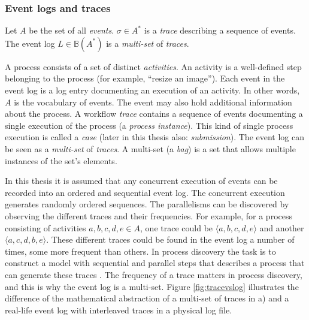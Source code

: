 \subsubsection{Event logs and traces}

\label{sec:eventtheory}

\begin{definition}
Let $A$ be the set of all \emph{events}. 
$\sigma \in A^*$ is a \emph{trace} describing a sequence of events.
The event log $L \in \mathbb{B}(A^*)$ is a \emph{multi-set} of \emph{traces}.
\end{definition}

A process consists of a set of distinct \emph{activities}.
An activity is a well-defined step belonging to the process (for example, ``resize an image'').
Each event in the event log is a log entry documenting an execution of an activity.
In other words, $A$ is the vocabulary of events.
The event may also hold additional information about the process.
A workflow \emph{trace} contains a sequence of events documenting a single execution of the process (a \emph{process instance}).
This kind of single process execution is called a \emph{case} (later in this thesis also: \emph{submission}).
The event log can be seen as a \emph{multi-set} of \emph{traces}. 
A multi-set (a \emph{bag}) is a set that allows multiple instances of the set's elements. \cite{van2015extracting}

In this thesis it is assumed that any concurrent execution of events can be recorded into
an ordered and sequential event log. 
The concurrent execution generates randomly ordered sequences.
The parallelisms can be discovered by observing the different traces and their frequencies.
For example, for a process consisting of activities $a,b,c,d,e \in A$, one trace could be 
$\langle a,b,c,d,e \rangle$ and another $\langle a,c,d,b,e \rangle$.
These different traces could be found in the event log a number of times, some more frequent than others.
In process discovery the task is to construct a model with sequential and parallel steps 
that describes a process that can generate these traces \cite{van2013discovering}.
The frequency of a trace matters in process discovery, and this is why the event log is a multi-set.
Figure \ref{fig:tracevslog} illustrates the difference of the mathematical abstraction of a multi-set of traces in a) and a real-life event log with interleaved traces in a physical log file.

